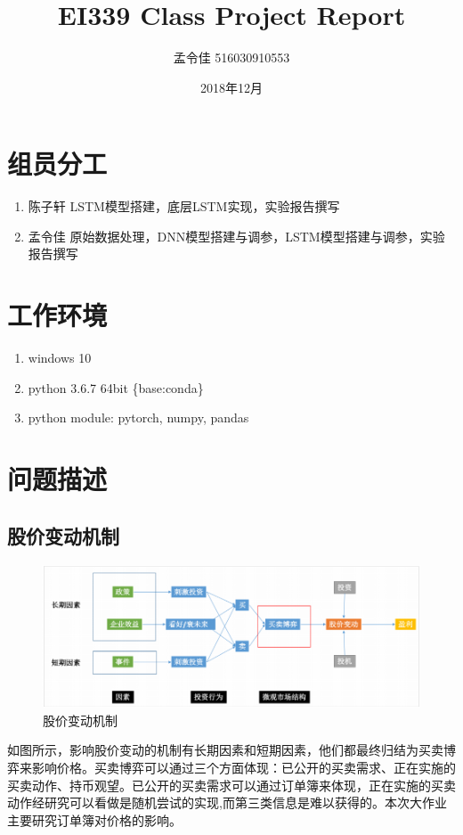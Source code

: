 \documentclass[UTF8]{ctexart}
\title{EI339 Class Project Report}
\author{孟令佳 516030910553}
\date{2018年12月}
\begin{document}
\maketitle
\tableofcontents
\newpage
\section{组员分工}
\begin{enumerate}
    \item 陈子轩 LSTM模型搭建，底层LSTM实现，实验报告撰写
    \item 孟令佳 原始数据处理，DNN模型搭建与调参，LSTM模型搭建与调参，实验报告撰写
\end{enumerate}
\section{工作环境}
\begin{enumerate}
    \item windows 10
    \item python 3.6.7 64bit \{base:conda\}
    \item python module: pytorch, numpy, pandas
\end{enumerate}
\section{问题描述}
\subsection{股价变动机制}
\begin{figure}[!htbp]
\centering
\includegraphics[scale = 0.6]{p1.png}
\caption{股价变动机制}
\end{figure}
如图所示，影响股价变动的机制有长期因素和短期因素，他们都最终归结为买卖博弈来影响价格。买卖博弈可以通过三个方面体现：已公开的买卖需求、正在实施的买卖动作、持币观望。已公开的买卖需求可以通过订单簿来体现，正在实施的买卖动作经研究可以看做是随机尝试的实现,而第三类信息是难以获得的。本次大作业主要研究订单簿对价格的影响。
\end{document}
